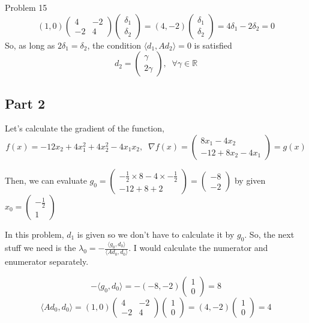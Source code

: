 \documentclass[12pt]{article}
\begin{document}
\begin{section}{Problem 15}
	$$(1,0) \begin{pmatrix}
	4 & -2\\
	-2 & 4 \end{pmatrix} \begin{pmatrix}
	\delta_1\\
     \delta_2 \end{pmatrix} = (4, -2) \begin{pmatrix}
     \delta_1\\
     \delta_2 \end{pmatrix} = 4\delta_1 - 2\delta_2 = 0$$
    So, as long as $2\delta_1 = \delta_2$, the condition $\langle d_1, Ad_2 \rangle = 0$ is satisfied
    $$d_2 = \begin{pmatrix}
    \gamma\\
    2\gamma \end{pmatrix}, \;\; \forall \gamma \in \mathbb{R}$$	
	\subsection{Part 2}
	
	Let's calculate the gradient of the function,
	\[f(x) = -12x_2 + 4x_1^2 + 4x_2^2-4x_1x_2, \;\; \nabla f(x) = \begin{pmatrix}
	8x_1 - 4x_2\\
	-12 + 8x_2 - 4x_1 \end{pmatrix} = g(x)\]
	
	Then, we can evaluate $g_0 = \begin{pmatrix}
	-\frac{1}{2} \times 8 - 4 \times -\frac{1}{2}\\
	-12 + 8 + 2
	\end{pmatrix} = \begin{pmatrix}
	-8\\
	-2
	\end{pmatrix}$ by given $x_0 = \begin{pmatrix}
	-\frac{1}{2}\\
	1
	\end{pmatrix}$
	
	In this problem, $d_1$ is given so we don't have to calculate it by $g_0$. So, the next stuff we need is the $\lambda_0 = -\frac{ \langle g_0, d_0 \rangle}{\langle Ad_0, d_0\rangle}$. I would calculate the numerator and enumerator separately.
	
	\[-\langle g_0, d_0 \rangle = -(-8, -2) \begin{pmatrix}
	1\\
	0
	\end{pmatrix} = 8\] 
	\[\langle Ad_0, d_0 \rangle  = (1,0) \begin{pmatrix}
	4 & -2\\
	-2 & 4
	\end{pmatrix} \begin{pmatrix}
	1\\
	0
	\end{pmatrix} = (4, -2) \begin{pmatrix}
	1\\
	0
	\end{pmatrix} = 4\]
	

\end{section}
\end{document}
